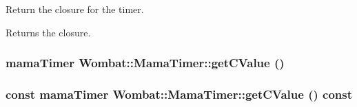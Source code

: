 Return the closure for the timer. \begin{DoxyReturn}{Returns}
the closure. 
\end{DoxyReturn}
\hypertarget{classWombat_1_1MamaTimer_a236a512b1ee0014b1898233c962c8383}{
\subsubsection[{getCValue}]{\setlength{\rightskip}{0pt plus 5cm}mamaTimer Wombat::MamaTimer::getCValue ()}}
\label{classWombat_1_1MamaTimer_a236a512b1ee0014b1898233c962c8383}
\hypertarget{classWombat_1_1MamaTimer_ac66a5f4a2d726c6017eb05fde1726fcb}{
\subsubsection[{getCValue}]{\setlength{\rightskip}{0pt plus 5cm}const mamaTimer Wombat::MamaTimer::getCValue () const}}
\label{classWombat_1_1MamaTimer_ac66a5f4a2d726c6017eb05fde1726fcb}
